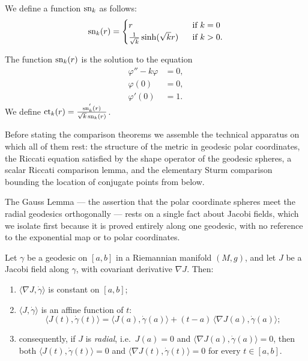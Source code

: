\begin{definition}
\label{def:sinh-comparison-function}




We define a function $\operatorname{sn}_k$ as follows:$$\operatorname{sn}_k(r)=\begin{cases}
r \ \  & \text{if }k=0 \\
\frac{1}{\sqrt{k}}\sinh(\sqrt{k}r) \ \ & \text{if } k>0.
\end{cases}$$
\end{definition}

The function $\operatorname{sn}_{k}(r)$ is the solution to the equation
\begin{align*}
 \varphi'' - k\varphi &= 0,\\
\varphi(0) &= 0,\\
\varphi'(0) &= 1.
\end{align*}
We define
 $\operatorname{ct}_{k}(r) = \frac{\operatorname{sn}_{k}^{'}(r)}{\sqrt{k}\operatorname{sn}_{k}(r)}$.

Before stating the comparison theorems we assemble the technical
apparatus on which all of them rest: the structure of the metric in
geodesic polar coordinates, the Riccati equation satisfied by the
shape operator of the geodesic spheres, a scalar Riccati comparison
lemma, and the elementary Sturm comparison bounding the location of
conjugate points from below.

The Gauss Lemma — the assertion that the polar coordinate spheres meet
the radial geodesics orthogonally — rests on a single fact about Jacobi
fields, which we isolate first because it is proved entirely along one
geodesic, with no reference to the exponential map or to polar
coordinates.

\begin{lemma}
\label{lem:radial-jacobi-orthogonal}





Let $\gamma$ be a geodesic on $[a,b]$ in a Riemannian manifold $(M,g)$,
and let $J$ be a Jacobi field along $\gamma$, with covariant derivative
$\nabla J$. Then:
\begin{enumerate}
\item $\langle\nabla J,\dot\gamma\rangle$ is constant on $[a,b]$;
\item $\langle J,\dot\gamma\rangle$ is an affine function of $t$:
$$\langle J(t),\dot\gamma(t)\rangle
=\langle J(a),\dot\gamma(a)\rangle
+(t-a)\,\langle\nabla J(a),\dot\gamma(a)\rangle;$$
\item consequently, if $J$ is {\sl radial}, i.e.\ $J(a)=0$ and
$\langle\nabla J(a),\dot\gamma(a)\rangle=0$, then both
$\langle J(t),\dot\gamma(t)\rangle=0$ and
$\langle\nabla J(t),\dot\gamma(t)\rangle=0$ for every $t\in[a,b]$.
\end{enumerate}
\end{lemma}

